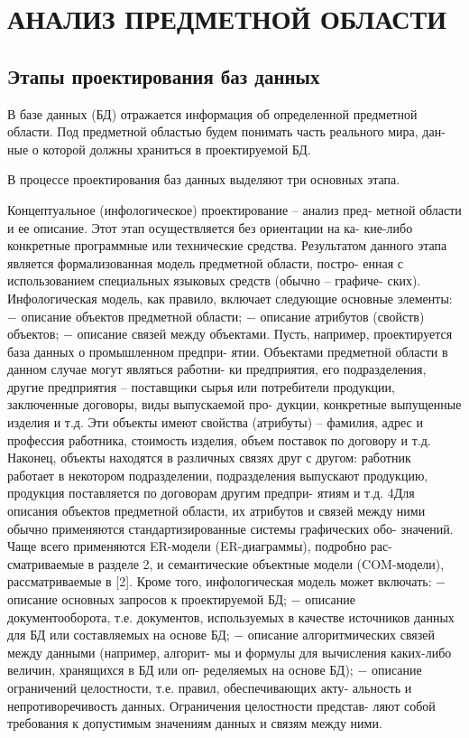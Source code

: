 \section[Анализ предметной области]{АНАЛИЗ ПРЕДМЕТНОЙ ОБЛАСТИ}

\subsection{Этапы проектирования баз данных}

В базе данных (БД) отражается информация об определенной предметной
области. Под предметной областью будем понимать часть реального мира, дан-
ные о которой должны храниться в проектируемой БД.

В процессе проектирования баз данных выделяют три основных этапа.

Концептуальное (инфологическое) проектирование – анализ пред-
метной области и ее описание. Этот этап осуществляется без ориентации на ка-
кие-либо конкретные программные или технические средства. Результатом
данного этапа является формализованная модель предметной области, постро-
енная с использованием специальных языковых средств (обычно – графиче-
ских). Инфологическая модель, как правило, включает следующие основные
элементы:
− описание объектов предметной области;
− описание атрибутов (свойств) объектов;
− описание связей между объектами.
Пусть, например, проектируется база данных о промышленном предпри-
ятии. Объектами предметной области в данном случае могут являться работни-
ки предприятия, его подразделения, другие предприятия – поставщики сырья
или потребители продукции, заключенные договоры, виды выпускаемой про-
дукции, конкретные выпущенные изделия и т.д. Эти объекты имеют свойства
(атрибуты) – фамилия, адрес и профессия работника, стоимость изделия, объем
поставок по договору и т.д. Наконец, объекты находятся в различных связях
друг с другом: работник работает в некотором подразделении, подразделения
выпускают продукцию, продукция поставляется по договорам другим предпри-
ятиям и т.д.
4Для описания объектов предметной области, их атрибутов и связей между
ними обычно применяются стандартизированные системы графических обо-
значений. Чаще всего применяются ER-модели (ER-диаграммы), подробно рас-
сматриваемые в разделе 2, и семантические объектные модели (COM-модели),
рассматриваемые в [2].
Кроме того, инфологическая модель может включать:
− описание основных запросов к проектируемой БД;
− описание документооборота, т.е. документов, используемых в качестве
источников данных для БД или составляемых на основе БД;
− описание алгоритмических связей между данными (например, алгорит-
мы и формулы для вычисления каких-либо величин, хранящихся в БД или оп-
ределяемых на основе БД);
− описание ограничений целостности, т.е. правил, обеспечивающих акту-
альность и непротиворечивость данных. Ограничения целостности представ-
ляют собой требования к допустимым значениям данных и связям между ними.

